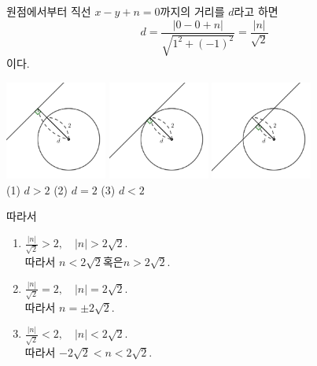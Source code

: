 \documentclass{oblivoir}
\begin{document}
\begin{mdframed}[frametitle=풀이2]
원점에서부터 직선 \(x-y+n=0\)까지의 거리를 \(d\)라고 하면
\[d=\frac{|0-0+n|}{\sqrt{1^2+(-1)^2}}=\frac{|n|}{\sqrt2}\]
이다.
\par\bigskip
\begin{center}
\includegraphics[width=0.25\textwidth]{circleline_1-1}\quad\qquad
\includegraphics[width=0.25\textwidth]{circleline_1-2}\quad\qquad
\includegraphics[width=0.25\textwidth]{circleline_1-3}\\
(1) \(d>2\)\qquad\qquad\qquad\quad
(2) \(d=2\)\qquad\qquad\qquad\quad
(3) \(d<2\)
\end{center}
\par\bigskip
따라서
\begin{enumerate}\setlength\itemsep{1em}
\item
\(\displaystyle\frac{|n|}{\sqrt2}>2,\quad|n|>2\sqrt2\).\\[1em]
따라서 \(n<2\sqrt2\)\:\:혹은\:\:\(n>2\sqrt2\).
\item
\(\displaystyle\frac{|n|}{\sqrt2}=2,\quad|n|=2\sqrt2\).\\[1em]
따라서 \(n=\pm2\sqrt2\).
\item
\(\displaystyle\frac{|n|}{\sqrt2}<2,\quad|n|<2\sqrt2\).\\[1em]
따라서 \(-2\sqrt2<n<2\sqrt2\).
\end{enumerate}
\end{mdframed}
\end{document}
